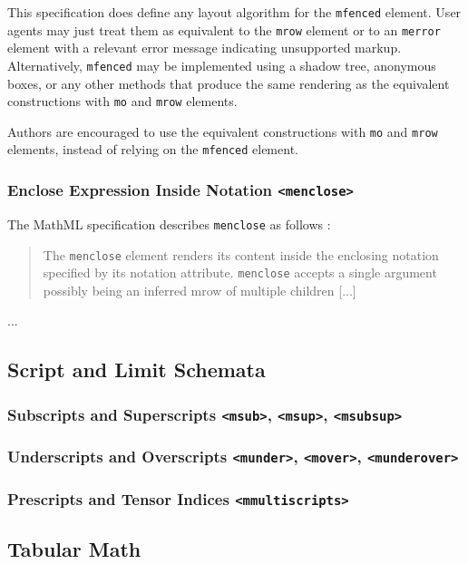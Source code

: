 This specification does define any layout algorithm for the {\tt mfenced}
element. User agents may just treat them as equivalent to the {\tt mrow} element
or to an {\tt merror} element with a relevant error message indicating
unsupported markup.
Alternatively, {\tt mfenced} may be implemented using a shadow tree, anonymous
boxes, or any other methods that produce the same rendering as the equivalent
constructions with {\tt mo} and {\tt mrow} elements.

Authors are encouraged to use the equivalent constructions with {\tt mo} and
{\tt mrow} elements, instead of relying on the {\tt mfenced} element.

\subsubsection{Enclose Expression Inside Notation {\tt <menclose>}}

The MathML specification describes {\tt menclose} as follows \cite{MathML3}:
%
\begin{quote}
The {\tt menclose} element renders its content inside the enclosing notation
specified by its notation attribute. {\tt menclose} accepts a single argument
possibly being an inferred mrow of multiple children [...]
\end{quote}

...

\subsection{Script and Limit Schemata}

\subsubsection{Subscripts and Superscripts {\tt <msub>}, {\tt <msup>},
  {\tt <msubsup>}}

\subsubsection{Underscripts and Overscripts  {\tt <munder>}, {\tt <mover>},
  {\tt <munderover>}}

\subsubsection{Prescripts and Tensor Indices \tt <mmultiscripts>}

\subsection{Tabular Math}


